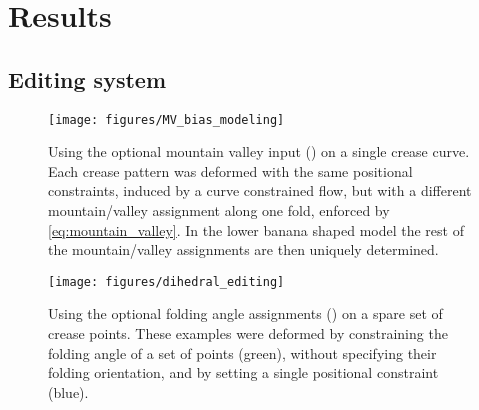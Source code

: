 \section{Results} \label{sec:results}

\subsection{Editing system}
\begin{figure} [h]
	\centering
	\texttt{[image: figures/MV\_bias\_modeling]}
	\caption{Using the optional mountain valley input () on a single crease curve. Each crease pattern was deformed with the same positional constraints, induced by a curve constrained flow, but with a different mountain/valley assignment along one fold, enforced by \eqref{eq:mountain_valley}. In the lower banana shaped model the rest of the mountain/valley assignments are then uniquely determined.}
	\label{fig:MV_bias_modeling}
\end{figure}

\begin{figure} [h]
	\centering
	\texttt{[image: figures/dihedral\_editing]}
	\caption{Using the optional folding angle assignments () on a spare set of crease points. These examples were deformed by constraining the folding angle of a set of points (green), without specifying their folding orientation, and by setting a single positional constraint (blue).}
	\label{fig:dihedral_editing}
\end{figure}